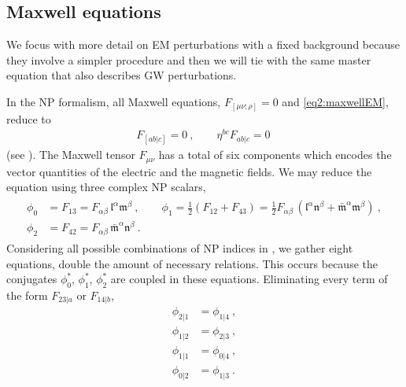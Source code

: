 
\subsection{Maxwell equations}

We focus with more detail on EM perturbations with a fixed background because they involve a simpler procedure and then we will tie with the same master equation that also describes GW perturbations. 
 
In the NP formalism, all Maxwell equations, $F_{[\mu\nu; \rho]}=0$ and \eqref{eq2:maxwellEM}, reduce to
\begin{align}
    \label{eq3:maxwellFabEqs}
    F_{[ab \rvert c]} = 0 ~,\qquad \eta^{bc} F_{ab \rvert c} = 0 ~
\end{align}
(see ).
The Maxwell tensor $F_{\mu\nu}$ has a total of six components which encodes the vector quantities of the electric and the magnetic fields. We may reduce the equation using three complex NP scalars,
\begin{align}
    \label{eq3:maxwellNPphi}
    \begin{split}
        \phi_0 &= F_{13} = F_{\alpha\beta} \,\mathfrak{l}^\alpha \mathfrak{m}^\beta ~,\qquad
        \phi_1 = \tfrac{1}{2} (F_{12} + F_{43}) = \tfrac{1}{2} F_{\alpha\beta} \,(\mathfrak{l}^\alpha \mathfrak{n}^\beta + \bar{\mathfrak{m}}^\alpha \mathfrak{m}^\beta) ~,\\
        \phi_2 &= F_{42} = F_{\alpha\beta} \,\bar{\mathfrak{m}}^\alpha \mathfrak{n}^\beta ~.
    \end{split}
\end{align}
Considering all possible combinations of NP indices in , we gather eight equations, double the amount of necessary relations. 
This occurs because the conjugates $\phi_0^*$, $\phi_1^*$, $\phi_2^*$ are coupled in these equations. Eliminating every term of the form $F_{23\rvert a}$ or $F_{14\rvert b}$, 
\begin{subequations}
    \begin{align}
        \phi_{2\rvert 1} &= \phi_{1\rvert 4} ~, \label{eq3:phi21phi14}\\
        \phi_{1\rvert 2} &= \phi_{2\rvert 3} ~, \label{eq3:phi12phi23}\\
        \phi_{1\rvert 1} &= \phi_{0\rvert 4} ~, \label{eq3:phi11phi04}\\
        \phi_{0\rvert 2} &= \phi_{1\rvert 3} ~. \label{eq3:phi02phi13}
    \end{align}
\end{subequations}
